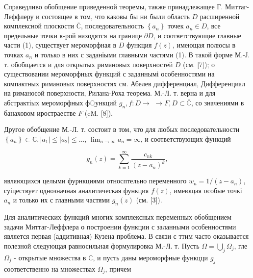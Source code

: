 \documentclass[10pt]{article}
\begin{document}
Справедливо обобщение приведенной теоремы, также принадлежащее $Г$. Миттаг-Леффлеру и состоящее в том, что каковы бы ни были область $D$ расширенной комплексной плоскости $\overline{\mathbb{C}}$, последовательность $\left\{a_{n}\right\}$ точек $a_{n} \in D$, все предельные точки к-рой находятся на границе $\partial D$, и соответствующие главные части (1), существует мероморфная в $D$ функция $f(z)$, имеющая полюсы в точках $a_{n}$ и только в них с заданіыми главными частями (1). В такой форме М.-Ј. т. обобщается и для открытых римановых поверхностей $D$ (см. [7]); о существовании мероморфных функций с заданнымі особенностями на компактных римановых поверхностях см. Абелев дифференциал, Дифференциал на риманоєой поверхности, Рилана-Роха теорема. М.-Л. т. верна и для абстрактіых мероморфных ф্ункций $g_{n}, f: D \rightarrow$ $\rightarrow F, D \subset \overline{\mathbb{C}}$, со значениями в банаховом иростраестве $F$ (cM. [8]).



Другое обобщение М.-Л. т. состоит в том, что для любых последовательности $\left\{a_{n}\right\} \subset \mathbb{C},\left|a_{1}\right| \leqslant\left|a_{2}\right| \leqslant \ldots$, $\lim _{n \rightarrow \infty} a_{n}=\infty$, и соответствующих функций



\[

g_{n}(z)=\sum_{k=1}^{\infty} \frac{c_{n k}}{\left(z-a_{n}\right)^{k}},

\]



являющихся целыми фурнкциями относптельно переменного $w_{n}=1 /\left(z-a_{n}\right)$, суіцествует однозначная аналитическая функция $f(z)$, имеющая особые точкі $a_{n}$ и только их с главными частями $g_{n}(z)$ (см. [3]).



Для аналитических функций многих комплексных переменных обобщением задачи Миттаг-Леффлера о построении функции с заланными особенностями является первая (аддитивная) Кузена проблема. В связи с ттим часто оказывается полезной следующая равносильная формулировка М.-Л. т. Пусть $\Omega=\bigcup_{j} \Omega_{j}$, гле $\Omega_{j}$ - открытые множества в $\mathbb{C}$, и пусть даны мероморфные функцци $g_{j}$ соответственно на множествах $\Omega_{j}$, причем
\end{document}
